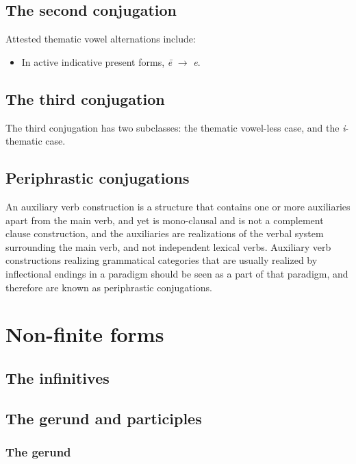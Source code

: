 \documentclass[a4paper, oneside, 12pt]{report}
\newcommand{\form}[1]{\emph{#1}}
\begin{document}
\subsection{The second conjugation}\label{sec:verb-morphology.2c}

Attested thematic vowel alternations include:
\begin{itemize}
    \item In active indicative present forms, \form{\={e}} $\to$ \form{e}.
\end{itemize}

\subsection{The third conjugation}

The third conjugation has two subclasses:
the thematic vowel-less case, 
and the \form{i}-thematic case.

\subsection{Periphrastic conjugations}

An auxiliary verb construction is a structure 
that contains one or more auxiliaries apart from the main verb, 
and yet is mono-clausal and is not a complement clause construction,
and the auxiliaries are realizations of the verbal system 
surrounding the main verb, and not independent lexical verbs.
Auxiliary verb constructions realizing grammatical categories 
that are usually realized by inflectional endings in a paradigm
should be seen as a part of that paradigm,
and therefore are known as periphrastic conjugations.

\section{Non-finite forms}

\subsection{The infinitives}\label{sec:infinitives}

\subsection{The gerund and participles}\label{sec:nominal-form}

\subsubsection{The gerund}\label{sec:gerund-morphology}
\end{document}
